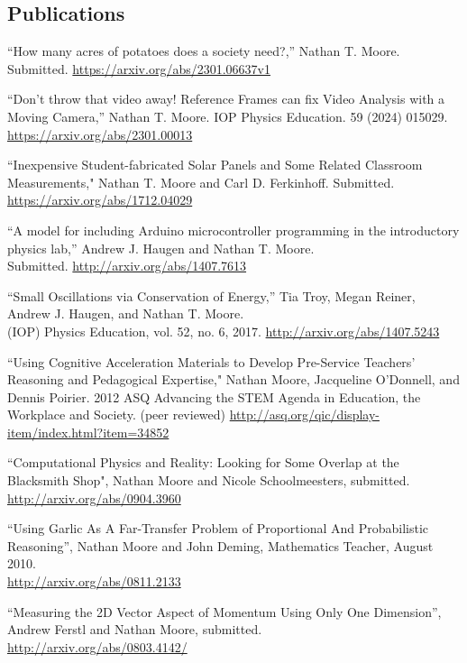 \documentclass[margin,line,letterpaper]{res}
\begin{document}
\begin{resume}
\section{\bf Publications}

``How many acres of potatoes does a society need?,''
Nathan T. Moore.
Submitted.
\url{https://arxiv.org/abs/2301.06637v1}

``Don't throw that video away! Reference Frames can fix Video Analysis with a Moving Camera,''
Nathan T. Moore.
IOP Physics Education. 
59 (2024) 015029.\\
\url{https://arxiv.org/abs/2301.00013}


``Inexpensive Student-fabricated Solar Panels and Some Related Classroom Measurements,"
Nathan T. Moore and Carl D. Ferkinhoff.
Submitted.\\
\url{https://arxiv.org/abs/1712.04029}

``A model for including Arduino microcontroller programming in the introductory physics lab,''
Andrew J. Haugen and Nathan T. Moore. \\
Submitted.
\url{http://arxiv.org/abs/1407.7613}

``Small Oscillations via Conservation of Energy,''
Tia Troy, Megan Reiner, Andrew J. Haugen, and Nathan T. Moore. \\
(IOP) Physics Education, vol. 52, no. 6, 2017.
\url{http://arxiv.org/abs/1407.5243}

``Using Cognitive Acceleration Materials to Develop Pre-Service Teachers' Reasoning and Pedagogical Expertise," 
Nathan Moore, Jacqueline O'Donnell, and Dennis Poirier.
2012 ASQ Advancing the STEM Agenda in Education, the Workplace and Society.
(peer reviewed)
\url{http://asq.org/qic/display-item/index.html?item=34852}

``Computational Physics and Reality: Looking for Some Overlap at the Blacksmith Shop",
Nathan Moore and Nicole Schoolmeesters,
submitted.\\
\url{http://arxiv.org/abs/0904.3960}

``Using Garlic As A Far-Transfer Problem of Proportional And Probabilistic Reasoning'',
Nathan Moore and John Deming, Mathematics Teacher, August 2010.\\
\url{http://arxiv.org/abs/0811.2133}

``Measuring the 2D Vector Aspect of Momentum Using Only One Dimension'',
Andrew Ferstl and Nathan Moore,
submitted.\\
\url{http://arxiv.org/abs/0803.4142/}


\end{resume}
\end{document}
